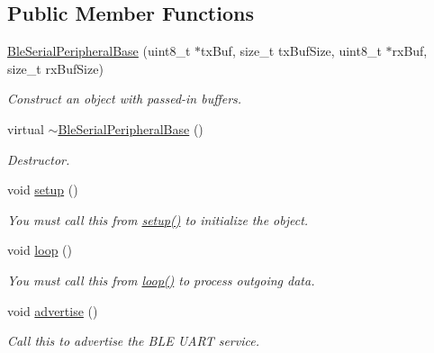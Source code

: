 \subsection*{Public Member Functions}
\begin{DoxyCompactItemize}
\item 
\mbox{\hyperlink{class_ble_serial_peripheral_base_a1c1811adb8b03e7c0cb6e5f6c0a42fab}{Ble\+Serial\+Peripheral\+Base}} (uint8\+\_\+t $\ast$tx\+Buf, size\+\_\+t tx\+Buf\+Size, uint8\+\_\+t $\ast$rx\+Buf, size\+\_\+t rx\+Buf\+Size)
\begin{DoxyCompactList}\small\item\em Construct an object with passed-\/in buffers. \end{DoxyCompactList}\item 
virtual \mbox{\hyperlink{class_ble_serial_peripheral_base_ab693dd8a00b3af5ed375d68647bb4712}{$\sim$\+Ble\+Serial\+Peripheral\+Base}} ()
\begin{DoxyCompactList}\small\item\em Destructor. \end{DoxyCompactList}\item 
\mbox{\label{class_ble_serial_peripheral_base_a01072243aecf86ea5030019a6e900fbb}} 
void \mbox{\hyperlink{class_ble_serial_peripheral_base_a01072243aecf86ea5030019a6e900fbb}{setup}} ()
\begin{DoxyCompactList}\small\item\em You must call this from \mbox{\hyperlink{class_ble_serial_peripheral_base_a01072243aecf86ea5030019a6e900fbb}{setup()}} to initialize the object. \end{DoxyCompactList}\item 
\mbox{\label{class_ble_serial_peripheral_base_a441dc005092891279967444cb2dc2ff2}} 
void \mbox{\hyperlink{class_ble_serial_peripheral_base_a441dc005092891279967444cb2dc2ff2}{loop}} ()
\begin{DoxyCompactList}\small\item\em You must call this from \mbox{\hyperlink{class_ble_serial_peripheral_base_a441dc005092891279967444cb2dc2ff2}{loop()}} to process outgoing data. \end{DoxyCompactList}\item 
void \mbox{\hyperlink{class_ble_serial_peripheral_base_a870258aa62e285cc0e2717476ae51145}{advertise}} ()
\begin{DoxyCompactList}\small\item\em Call this to advertise the B\+LE U\+A\+RT service. \end{DoxyCompactList}\item 

\end{DoxyCompactItemize}
